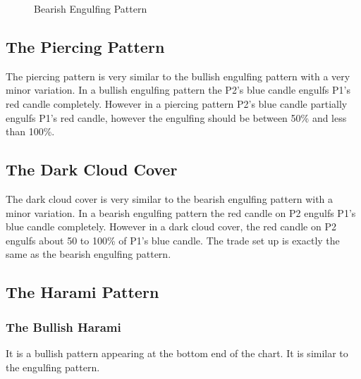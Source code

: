 \begin{figure}[h]
  \centering

  \caption{Bearish Engulfing Pattern}
\end{figure}


\subsection{The Piercing Pattern}

The piercing pattern is very similar to the bullish engulfing pattern with a very minor variation. In a bullish engulfing pattern the P2’s blue candle engulfs P1’s red candle completely. However in a piercing pattern P2’s blue candle partially engulfs P1’s red candle, however the engulfing should be between 50\% and less than 100\%.

\subsection{The Dark Cloud Cover}

The dark cloud cover is very similar to the bearish engulfing pattern with a minor variation. In a bearish engulfing pattern the red candle on P2 engulfs P1’s blue candle completely. However in a dark cloud cover, the red candle on P2 engulfs about 50 to 100\% of P1’s blue candle. The trade set up is exactly the same as the bearish engulfing pattern.


\newpage

\subsection{The Harami Pattern}

\subsubsection{The Bullish Harami}
It is a bullish pattern appearing at the bottom end of the chart. It is similar to the engulfing pattern.

